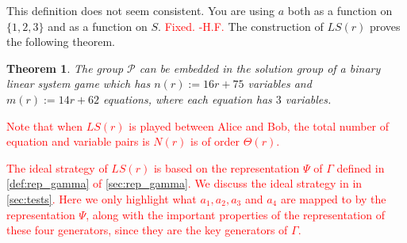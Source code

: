 \documentclass[11pt,letterpaper]{article}
\newcommand{\1}{\mathbb{1}}
\newcommand{\Pg}{\mathcal{P}}
\newcommand{\LS}{LS}
\newcommand{\nr}{n(r)}
\newcommand{\mr}{m(r)}
\def\carl#1{{\color{blue} #1}}
\newcommand{\hf}[1]{\textcolor{red}{#1}}
\newcommand{\hfc}[1]{\textcolor{red}{#1 -H.F.}}
\newtheorem{theorem}{Theorem}[section]
\theoremstyle{definition}
\begin{document}
\carl{This definition does not seem consistent.  You are using $a$ both as a function on $\{ 1, 2, 3 \}$ and as a function on $S$.}
\hfc{Fixed.}
The construction of $\LS(r)$ proves the following theorem.
\begin{theorem}
	The group $\Pg$ can be embedded in the solution group of a binary linear system game which has
	$\nr := 16r+75$ variables and $\mr := 14r + 62$ equations, where each equation has $3$ variables.
\end{theorem}
\hf{Note that when $\LS(r)$ is played between Alice and Bob, the total
number of equation and variable pairs is $N(r)$ is of order $\Theta(r)$.}

\hf{The ideal strategy of $\LS(r)$ is based on
the representation $\Psi$ of $\Gamma$ defined in \cref{def:rep_gamma}
of \cref{sec:rep_gamma}.
We discuss the ideal strategy in in \cref{sec:tests}.
Here we only highlight what $a_1, a_2, a_3$ and $a_4$ are mapped to by the representation $\Psi$, along
with the important properties of the representation of these four generators,
since they are the key generators of $\Gamma$.
}
\end{document}
